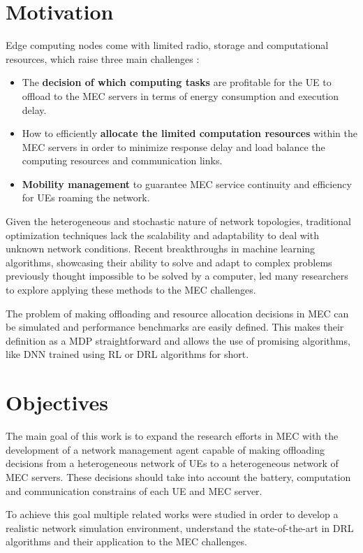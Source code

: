 \clearpage

\section{Motivation}
\noindent Edge computing nodes come with limited radio, storage and computational resources, which raise three main challenges \cite{SHAKARAMI2020107496}:
\begin{itemize}
    \item The \textbf{decision of which computing tasks} are profitable for the \acrshort{UE} to offload to the \acrshort{MEC} servers in terms of energy consumption and execution delay.
    \item How to efficiently \textbf{allocate the limited computation resources} within the \acrshort{MEC} servers in order to minimize response delay and load balance the computing resources and communication links.
    \item \textbf{Mobility management} to guarantee \acrshort{MEC} service continuity and efficiency for \acrshort{UE}s roaming the network.
\end{itemize}

Given the heterogeneous and stochastic nature of network topologies, traditional optimization techniques lack the scalability and adaptability to deal with unknown network conditions. Recent breakthroughs in machine learning algorithms, showcasing their ability to solve and adapt to complex problems previously thought impossible to be solved by a computer, led many researchers to explore applying these methods to the \acrshort{MEC} challenges.
\par
The problem of making offloading and resource allocation decisions in \acrshort{MEC} can be simulated and performance benchmarks are easily defined. This makes their definition as a \acrfull{MDP} straightforward and allows the use of promising algorithms, like \acrfull{DNN} trained using \acrfull{RL} or \acrfull{DRL} algorithms for short. 

\section{Objectives}
\noindent The main goal of this work is to expand the research efforts in \acrshort{MEC} with the development of a network management agent capable of making offloading decisions from a heterogeneous network of \acrshort{UE}s to a heterogeneous network of \acrshort{MEC} servers. These decisions should take into account the battery, computation and communication constrains of each \acrshort{UE} and \acrshort{MEC} server.
\par
To achieve this goal multiple related works were studied in order to develop a realistic network simulation environment, understand the state-of-the-art in \acrshort{DRL} algorithms and their application to the \acrshort{MEC} challenges.

